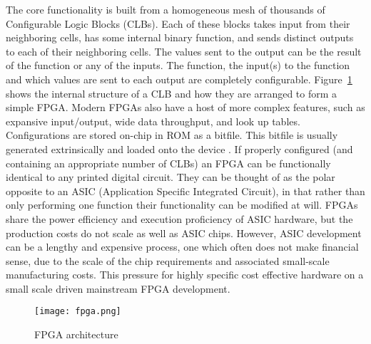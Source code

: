 The core functionality is built from a homogeneous mesh of
thousands of Configurable Logic Blocks (CLBs).
Each of these blocks takes input from their
neighboring cells, has some internal binary function, and sends distinct outputs
to each of their neighboring cells. The values sent to the output can be the
result of the function or any of the inputs. The function, the input(s) to the function
and which values are sent to each output are completely configurable. Figure~\ref{fig:fpga}
shows the internal structure of a CLB and how they are arranged to form a simple FPGA.
Modern FPGAs also have a host of more complex features, such as expansive input/output,
wide data throughput, and look up tables.
Configurations are stored on-chip in ROM as a bitfile. This bitfile is usually generated
extrinsically \cite{10.1007/978-3-540-46239-2_5} and loaded onto the device \cite{Kuon:2008:FAS:1454695.1454696}.
If properly configured (and containing an appropriate number of CLBs) an FPGA can
be functionally identical to any printed digital circuit. They can be thought of
as the polar opposite to an ASIC (Application Specific Integrated Circuit), in that
rather than only performing one function their functionality can be modified at will.
FPGAs share the power efficiency and execution proficiency of ASIC hardware, but
the production costs do not scale as well as ASIC chips. However, ASIC development can
be a lengthy and expensive process, one which often does not make financial sense,
due to the scale of the chip requirements and associated small-scale manufacturing
costs. This pressure for highly specific cost effective hardware on a small scale
driven mainstream FPGA development.

\begin{figure}
\centering
\texttt{[image: fpga.png]}
\caption{FPGA architecture}
\label{fig:fpga}
\end{figure}

